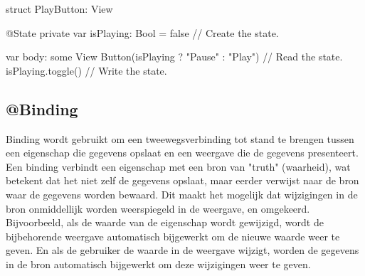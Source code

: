 \begin{swift}[caption=Example of @State code \autocite{AppleState}, label=state_example]
    struct PlayButton: View {
        @State private var isPlaying: Bool = false // Create the state.
        
        
        var body: some View {
            Button(isPlaying ? "Pause" : "Play") { // Read the state.
                isPlaying.toggle() // Write the state.
            }
        }
    }
\end{swift}


\subsection{@Binding}
\autocite{AppleBinding} Binding wordt gebruikt om een tweewegsverbinding tot stand te brengen tussen een eigenschap die gegevens opslaat en een weergave die de gegevens presenteert. Een binding verbindt een eigenschap met een bron van "truth" (waarheid), wat betekent dat het niet zelf de gegevens opslaat, maar eerder verwijst naar de bron waar de gegevens worden bewaard. Dit maakt het mogelijk dat wijzigingen in de bron onmiddellijk worden weerspiegeld in de weergave, en omgekeerd. Bijvoorbeeld, als de waarde van de eigenschap wordt gewijzigd, wordt de bijbehorende weergave automatisch bijgewerkt om de nieuwe waarde weer te geven. En als de gebruiker de waarde in de weergave wijzigt, worden de gegevens in de bron automatisch bijgewerkt om deze wijzigingen weer te geven.



